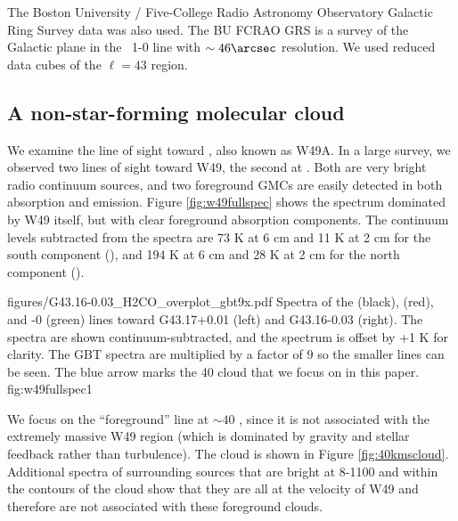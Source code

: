 The Boston University / Five-College Radio Astronomy Observatory Galactic Ring
Survey \thirteenco data was also used.  The BU FCRAO GRS \citep{Jackson2006a}
is a survey of the Galactic plane in the \thirteenco\ 1-0 line with $\sim
46\arcsec$ resolution.  We used reduced data cubes of the $\ell=43$ region.

\subsection{\GRSMC A non-star-forming molecular cloud}



We examine the line of sight toward \north, also known as W49A.  In a large
survey, we observed two lines of sight toward W49, the second at \south.  Both
are very bright radio continuum sources, and two foreground GMCs are easily
detected in both \formaldehyde absorption and \thirteenco emission.  Figure
\ref{fig:w49fullspec} shows the spectrum dominated by W49 itself, but with
clear \formaldehyde foreground absorption components.  The continuum levels
subtracted from the spectra are 73 K at 6 cm and 11 K at 2 cm for the south
component (\south), and 194 K at 6 cm and 28 K at 2 cm for the north component
(\north).


          {figures/G43.16-0.03_H2CO_overplot_gbt9x.pdf}
{Spectra of the \formaldehyde \oneone (black), \twotwo (red), and -0 (green) lines toward G43.17+0.01 (left) and G43.16-0.03 (right).
The \formaldehyde spectra are shown continuum-subtracted, and the \thirteenco
spectrum is offset by +1 K for clarity.  The GBT \twotwo spectra are multiplied
by a factor of 9 so the smaller lines can be seen.  The blue arrow marks the 40 \kms
cloud \GRSMC that we focus on in this paper. 
}{fig:w49fullspec}{1}

We focus on the ``foreground'' line at $\sim40$ \kms, since it is not
associated with the extremely massive W49 region (which is dominated by gravity
and stellar feedback rather than turbulence).  The cloud is shown in Figure
\ref{fig:40kmscloud}.  
Additional \formaldehyde spectra of surrounding sources that are bright at
8-1100 \um and within the \thirteenco contours of the cloud show that they are
all at the velocity of W49 and therefore are not associated with these
foreground clouds.  

